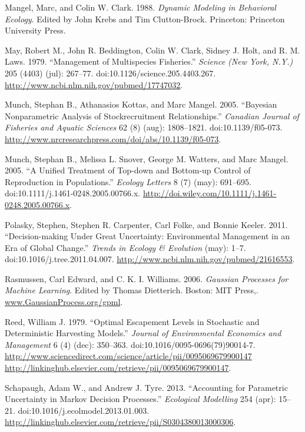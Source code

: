 \documentclass[author-year, review]{elsarticle} %
\begin{document}
Mangel, Marc, and Colin W. Clark. 1988. \emph{Dynamic Modeling in
Behavioral Ecology}. Edited by John Krebs and Tim Clutton-Brock.
Princeton: Princeton University Press.

May, Robert M., John R. Beddington, Colin W. Clark, Sidney J. Holt, and
R. M. Laws. 1979. ``Management of Multispecies Fisheries.''
\emph{Science (New York, N.Y.)} 205 (4403) (jul): 267--77.
doi:10.1126/science.205.4403.267.
\url{http://www.ncbi.nlm.nih.gov/pubmed/17747032}.

Munch, Stephan B., Athanasios Kottas, and Marc Mangel. 2005. ``Bayesian
Nonparametric Analysis of Stockrecruitment Relationships.''
\emph{Canadian Journal of Fisheries and Aquatic Sciences} 62 (8) (aug):
1808--1821. doi:10.1139/f05-073.
\url{http://www.nrcresearchpress.com/doi/abs/10.1139/f05-073}.

Munch, Stephan B., Melissa L. Snover, George M. Watters, and Marc
Mangel. 2005. ``A Unified Treatment of Top-down and Bottom-up Control of
Reproduction in Populations.'' \emph{Ecology Letters} 8 (7) (may):
691--695. doi:10.1111/j.1461-0248.2005.00766.x.
\url{http://doi.wiley.com/10.1111/j.1461-0248.2005.00766.x}.

Polasky, Stephen, Stephen R. Carpenter, Carl Folke, and Bonnie Keeler.
2011. ``Decision-making Under Great Uncertainty: Environmental
Management in an Era of Global Change.'' \emph{Trends in Ecology \&
Evolution} (may): 1--7. doi:10.1016/j.tree.2011.04.007.
\url{http://www.ncbi.nlm.nih.gov/pubmed/21616553}.

Rasmussen, Carl Edward, and C. K. I. Williams. 2006. \emph{Gaussian
Processes for Machine Learning}. Edited by Thomas Dietterich. Boston:
MIT Press,. \url{www.GaussianProcess.org/gpml}.

Reed, William J. 1979. ``Optimal Escapement Levels in Stochastic and
Deterministic Harvesting Models.'' \emph{Journal of Environmental
Economics and Management} 6 (4) (dec): 350--363.
doi:10.1016/0095-0696(79)90014-7.
\href{http://www.sciencedirect.com/science/article/pii/0095069679900147 http://linkinghub.elsevier.com/retrieve/pii/0095069679900147}{http://www.sciencedirect.com/science/article/pii/0095069679900147
http://linkinghub.elsevier.com/retrieve/pii/0095069679900147}.

Schapaugh, Adam W., and Andrew J. Tyre. 2013. ``Accounting for
Parametric Uncertainty in Markov Decision Processes.'' \emph{Ecological
Modelling} 254 (apr): 15--21. doi:10.1016/j.ecolmodel.2013.01.003.
\url{http://linkinghub.elsevier.com/retrieve/pii/S0304380013000306}.
\end{document}
